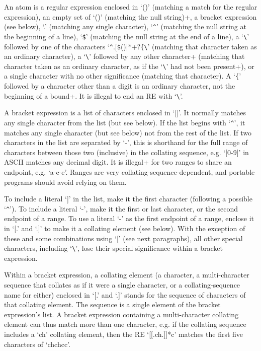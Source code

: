 An atom is a regular expression enclosed in `()' (matching a match for
the regular expression), an empty set of `()' (matching the null
string)+, a bracket expression (see below), `.' (matching any single
character), `\verb|^|' (matching the null string at the beginning of a
line), `\verb|$|' (matching the null string at the end of a line), a
`\verb|\|' followed by one of the characters
`\verb|^|.[\verb|$|()|*+?\verb|{|\verb|\|' (matching that character
taken as an ordinary character), a `\verb|\|' followed by any other
character+ (matching that character taken as an ordinary character,
as if the `\verb|\|' had not been present+), or a single character
with no other significance (matching that character). A `\verb|{|'
followed by a character other than a digit is an ordinary
character, not the beginning of a bound+. It is illegal to end an
RE with `\verb|\|'.

A bracket expression is a list of characters enclosed in `[]'. It
normally matches any single character from the list (but see below).
If the list begins with `\verb|^|', it matches any single character
(but see below) not from the rest of the list. If two characters in
the list are separated by `-', this is shorthand for the full range of
characters between those two (inclusive) in the collating sequence,
e.g. `[0-9]' in ASCII matches any decimal digit. It is illegal+ for
two ranges to share an endpoint, e.g.  `a-c-e'. Ranges are very
collating-sequence-dependent, and portable programs should avoid
relying on them.

To include a literal `]' in the list, make it the first character
(following a possible `\verb|^|'). To include a literal `-', make it
the first or last character, or the second endpoint of a range. To use
a literal `-' as the first endpoint of a range, enclose it in `[.' and
`.]' to make it a collating element (see below). With the exception of
these and some combinations using `[' (see next paragraphs), all other
special characters, including `\verb|\|', lose their special significance
within a bracket expression.

Within a bracket expression, a collating element (a character, a
multi-character sequence that collates as if it were a single
character, or a collating-sequence name for either) enclosed in `[.'
and `.]' stands for the sequence of characters of that collating
element. The sequence is a single element of the bracket expression's
list. A bracket expression containing a multi-character collating
element can thus match more than one character, e.g. if the collating
sequence includes a `ch' collating element, then the RE `[[.ch.]]*c'
matches the first five characters of `chchcc'.


